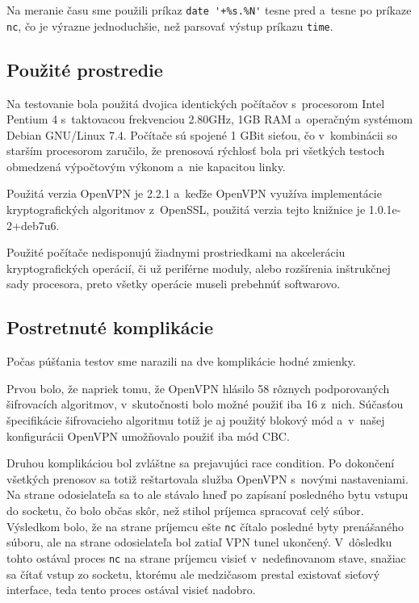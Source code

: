 \documentclass[12pt,a4paper]{article}
\begin{document}
Na meranie času sme použili príkaz \verb|date '+%s.%N'| tesne pred a~tesne
po príkaze \verb|nc|, čo je výrazne jednoduchšie, než parsovať výstup
príkazu \verb|time|.

\subsection{Použité prostredie}

Na testovanie bola použitá dvojica identických počítačov s~procesorom
Intel Pentium 4 s~taktovacou frekvenciou 2.80GHz, 1GB RAM a~operačným
systémom Debian GNU/Linux 7.4. Počítače sú spojené 1 GBit sieťou, čo
v~kombinácii so starším procesorom zaručilo, že prenosová rýchlosť bola
pri všetkých testoch obmedzená výpočtovým výkonom a~nie kapacitou linky.

Použitá verzia OpenVPN je 2.2.1 a~keďže OpenVPN využíva implementácie
kryptografických algoritmov z~OpenSSL, použitá verzia tejto knižnice je
1.0.1e-2+deb7u6.

Použité počítače nedisponujú žiadnymi prostriedkami na akceleráciu
kryptografických operácií, či už periférne moduly, alebo rozšírenia
inštrukčnej sady procesora, preto všetky operácie museli prebehnúť
softwarovo.

\subsection{Postretnuté komplikácie}

Počas púšťania testov sme narazili na dve komplikácie hodné zmienky.

Prvou bolo, že napriek tomu, že OpenVPN hlásilo 58 rôznych podporovaných
šifrovacích algoritmov, v~skutočnosti bolo možné použiť iba 16 z~nich.
Súčasťou špecifikácie šifrovacieho algoritmu totiž je aj použitý blokový
mód a~v~našej konfigurácii OpenVPN umožňovalo použiť iba mód CBC.

Druhou komplikáciou bol zvláštne sa prejavujúci race condition. Po
dokončení všetkých prenosov sa totiž reštartovala služba OpenVPN s~novými
nastaveniami. Na strane odosielateľa sa to ale stávalo hneď po zapísaní
posledného bytu vstupu do socketu, čo bolo občas skôr, než stihol príjemca
spracovať celý súbor. Výsledkom bolo, že na strane príjemcu ešte \verb|nc|
čítalo posledné byty prenášaného súboru, ale na strane odosielateľa bol
zatiaľ VPN tunel ukončený. V~dôsledku tohto ostával proces \verb|nc| na
strane príjemcu visieť v~nedefinovanom stave, snažiac sa čítať vstup zo
socketu, ktorému ale medzičasom prestal existovať sieťový interface, teda
tento proces ostával visieť nadobro.
\end{document}
